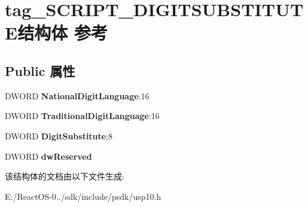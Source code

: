 \hypertarget{structtag___s_c_r_i_p_t___d_i_g_i_t_s_u_b_s_t_i_t_u_t_e}{}\section{tag\+\_\+\+S\+C\+R\+I\+P\+T\+\_\+\+D\+I\+G\+I\+T\+S\+U\+B\+S\+T\+I\+T\+U\+T\+E结构体 参考}
\label{structtag___s_c_r_i_p_t___d_i_g_i_t_s_u_b_s_t_i_t_u_t_e}
\subsection*{Public 属性}
\begin{DoxyCompactItemize}
\item 
\mbox{\label{structtag___s_c_r_i_p_t___d_i_g_i_t_s_u_b_s_t_i_t_u_t_e_a1a0a1849b782c98f7316b462075a8aa7}} 
D\+W\+O\+RD {\bfseries National\+Digit\+Language}\+:16
\item 
\mbox{\label{structtag___s_c_r_i_p_t___d_i_g_i_t_s_u_b_s_t_i_t_u_t_e_a019afd8648b8c526c0626d1be6455efe}} 
D\+W\+O\+RD {\bfseries Traditional\+Digit\+Language}\+:16
\item 
\mbox{\label{structtag___s_c_r_i_p_t___d_i_g_i_t_s_u_b_s_t_i_t_u_t_e_a2ff65ef6f5bf3623694ef18edb8df47d}} 
D\+W\+O\+RD {\bfseries Digit\+Substitute}\+:8
\item 
\mbox{\label{structtag___s_c_r_i_p_t___d_i_g_i_t_s_u_b_s_t_i_t_u_t_e_a3fb08906489d9de6ac0f52576dcf49a0}} 
D\+W\+O\+RD {\bfseries dw\+Reserved}
\end{DoxyCompactItemize}


该结构体的文档由以下文件生成\+:\begin{DoxyCompactItemize}
\item 
E\+:/\+React\+O\+S-\/0../sdk/include/psdk/usp10.\+h\end{DoxyCompactItemize}
